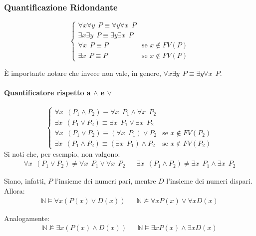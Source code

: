 \subsubsection{Quantificazione Ridondante}
$$
\begin{cases}
  \forall x \forall y ~~ P  \equiv \forall y \forall x ~~ P \\
  \exists x \exists y ~~ P  \equiv \exists y \exists x ~~ P \\
  \forall x ~~ P \equiv P  & \text{se } x \notin FV(P) \\
  \exists x ~~ P \equiv P  & \text{se } x \notin FV(P)
\end{cases}
$$

\`E importante notare che invece non vale, in genere, $\forall x \exists y ~~ P \equiv \exists y \forall x ~~ P$.  


\paragraph{Quantificatore rispetto a $\land$ e $\lor$}
$$
\begin{cases}
        \forall x ~~ (P_1 \land P_2) \equiv \forall x ~~ P_1 \land \forall x ~~ P_2 \\
        \exists x ~~ (P_1 \lor P_2) \equiv \exists x ~~ P_1 \lor \exists x ~~ P_2 \\
        \forall x ~~ (P_1 \lor P_2) \equiv (\forall x ~~ P_1) \lor P_2 & \text{se } x \notin FV(P_2) \\
        \exists x ~~ (P_1 \land P_2) \equiv (\exists x ~~ P_1) \land P_2 & \text{se } x \notin FV(P_2)
\end{cases}
$$
Si noti che, per esempio, non valgono:
\begin{align*}
\forall x ~~ (P_1 \lor P_2) \neq \forall x ~~ P_1 \lor \forall x ~~ P_2 &&
\exists x ~~ (P_1 \land P_2) \neq \exists x ~~ P_1 \land \exists x ~~ P_2
\end{align*}

Siano, infatti, $P$ l'insieme dei numeri pari, mentre $D$ l'insieme dei numeri dispari. Allora:
\begin{align*}
\mathbb{N} \models \forall x (P(x) \lor D(x)) &&
\mathbb{N} \nvDash \forall x P(x) \lor \forall x D(x)
\end{align*}

Analogamente:
\begin{align*}
\mathbb{N } \nvDash \exists x (P(x) \land D(x)) &&
\mathbb{N} \models \exists x P(x) \land \exists x D(x)
\end{align*}

